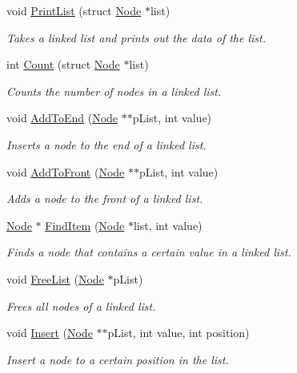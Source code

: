 \begin{DoxyCompactItemize}
\item 
void \hyperlink{namespace_c_s170_1_1_list_lab_ad12bd3e2be905ca300fed8d86bbe451c}{Print\-List} (struct \hyperlink{struct_c_s170_1_1_list_lab_1_1_node}{Node} $\ast$list)
\begin{DoxyCompactList}\small\item\em Takes a linked list and prints out the data of the list. \end{DoxyCompactList}\item 
int \hyperlink{namespace_c_s170_1_1_list_lab_af7f68722128ba05e357f4b7c4649e4ba}{Count} (struct \hyperlink{struct_c_s170_1_1_list_lab_1_1_node}{Node} $\ast$list)
\begin{DoxyCompactList}\small\item\em Counts the number of nodes in a linked list. \end{DoxyCompactList}\item 
void \hyperlink{namespace_c_s170_1_1_list_lab_ae34c684fdc4cf1f78cc274648b722395}{Add\-To\-End} (\hyperlink{struct_c_s170_1_1_list_lab_1_1_node}{Node} $\ast$$\ast$p\-List, int value)
\begin{DoxyCompactList}\small\item\em Inserts a node to the end of a linked list. \end{DoxyCompactList}\item 
void \hyperlink{namespace_c_s170_1_1_list_lab_a2a5b40886095fac247a776f56b9accd1}{Add\-To\-Front} (\hyperlink{struct_c_s170_1_1_list_lab_1_1_node}{Node} $\ast$$\ast$p\-List, int value)
\begin{DoxyCompactList}\small\item\em Adds a node to the front of a linked list. \end{DoxyCompactList}\item 
\hyperlink{struct_c_s170_1_1_list_lab_1_1_node}{Node} $\ast$ \hyperlink{namespace_c_s170_1_1_list_lab_a8f308bba80075164265470b8f103c6c2}{Find\-Item} (\hyperlink{struct_c_s170_1_1_list_lab_1_1_node}{Node} $\ast$list, int value)
\begin{DoxyCompactList}\small\item\em Finds a node that contains a certain value in a linked list. \end{DoxyCompactList}\item 
void \hyperlink{namespace_c_s170_1_1_list_lab_a3b7208271dd1d4671707dfe9ce6613a2}{Free\-List} (\hyperlink{struct_c_s170_1_1_list_lab_1_1_node}{Node} $\ast$p\-List)
\begin{DoxyCompactList}\small\item\em Frees all nodes of a linked list. \end{DoxyCompactList}\item 
void \hyperlink{namespace_c_s170_1_1_list_lab_a1fe547398adbb7a59b6d4638f92958c9}{Insert} (\hyperlink{struct_c_s170_1_1_list_lab_1_1_node}{Node} $\ast$$\ast$p\-List, int value, int position)
\begin{DoxyCompactList}\small\item\em Insert a node to a certain position in the list. \end{DoxyCompactList}\end{DoxyCompactItemize}


